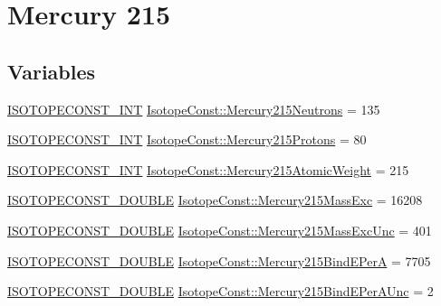\hypertarget{group___isotope_const-_mercury-_hg215}{}\section{Mercury 215}
\label{group___isotope_const-_mercury-_hg215}
\subsection*{Variables}
\begin{DoxyCompactItemize}
\item 
\mbox{\hyperlink{group___isotope_const-_macros_ga5f18360b3e99483a35c32d789e62621c}{I\+S\+O\+T\+O\+P\+E\+C\+O\+N\+S\+T\+\_\+\+I\+NT}} \mbox{\hyperlink{group___isotope_const-_mercury-_hg215_gafff187bb2ad4cb3a5b1dccafa07887c3}{Isotope\+Const\+::\+Mercury215\+Neutrons}} = 135
\item 
\mbox{\hyperlink{group___isotope_const-_macros_ga5f18360b3e99483a35c32d789e62621c}{I\+S\+O\+T\+O\+P\+E\+C\+O\+N\+S\+T\+\_\+\+I\+NT}} \mbox{\hyperlink{group___isotope_const-_mercury-_hg215_gab507c5424106ce480b82c53998c8f0fb}{Isotope\+Const\+::\+Mercury215\+Protons}} = 80
\item 
\mbox{\hyperlink{group___isotope_const-_macros_ga5f18360b3e99483a35c32d789e62621c}{I\+S\+O\+T\+O\+P\+E\+C\+O\+N\+S\+T\+\_\+\+I\+NT}} \mbox{\hyperlink{group___isotope_const-_mercury-_hg215_gad50d12baf68579d43ab23cc70e6efa87}{Isotope\+Const\+::\+Mercury215\+Atomic\+Weight}} = 215
\item 
\mbox{\hyperlink{group___isotope_const-_macros_ga8f45a7272ce02c0b4c65c44636ed719a}{I\+S\+O\+T\+O\+P\+E\+C\+O\+N\+S\+T\+\_\+\+D\+O\+U\+B\+LE}} \mbox{\hyperlink{group___isotope_const-_mercury-_hg215_gad878facf39df00d0f4e526b1cd2d6d04}{Isotope\+Const\+::\+Mercury215\+Mass\+Exc}} = 16208
\item 
\mbox{\hyperlink{group___isotope_const-_macros_ga8f45a7272ce02c0b4c65c44636ed719a}{I\+S\+O\+T\+O\+P\+E\+C\+O\+N\+S\+T\+\_\+\+D\+O\+U\+B\+LE}} \mbox{\hyperlink{group___isotope_const-_mercury-_hg215_gac803d27041f4ce44dfaf76f77b759b67}{Isotope\+Const\+::\+Mercury215\+Mass\+Exc\+Unc}} = 401
\item 
\mbox{\hyperlink{group___isotope_const-_macros_ga8f45a7272ce02c0b4c65c44636ed719a}{I\+S\+O\+T\+O\+P\+E\+C\+O\+N\+S\+T\+\_\+\+D\+O\+U\+B\+LE}} \mbox{\hyperlink{group___isotope_const-_mercury-_hg215_ga5bfcbfa46239606903fcf95c3868b4af}{Isotope\+Const\+::\+Mercury215\+Bind\+E\+PerA}} = 7705
\item 
\mbox{\hyperlink{group___isotope_const-_macros_ga8f45a7272ce02c0b4c65c44636ed719a}{I\+S\+O\+T\+O\+P\+E\+C\+O\+N\+S\+T\+\_\+\+D\+O\+U\+B\+LE}} \mbox{\hyperlink{group___isotope_const-_mercury-_hg215_ga9541fd567ae2b0e9872dbc7d3fbaec62}{Isotope\+Const\+::\+Mercury215\+Bind\+E\+Per\+A\+Unc}} = 2

\end{DoxyCompactItemize}
